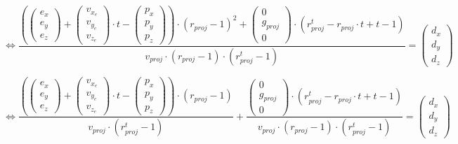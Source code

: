 \begin{equation*}
    \Leftrightarrow \frac{({\begin{pmatrix} e_x \\ e_y \\ e_z \end{pmatrix}} + {\begin{pmatrix} v_{x_e} \\ v_{y_e} \\ v_{z_e} \end{pmatrix}} \cdot t - {\begin{pmatrix} p_x \\ p_y \\ p_z \end{pmatrix}}) \cdot (r_{proj} - 1)^2 + {\begin{pmatrix} 0 \\ g_{proj} \\ 0 \end{pmatrix}} \cdot (r_{proj}^t - r_{proj} \cdot t + t - 1)}{v_{proj} \cdot (r_{proj} - 1) \cdot (r_{proj}^t - 1)} = {\begin{pmatrix} d_x \\ d_y \\ d_z \end{pmatrix}}
\end{equation*}

\begin{equation*}
    \Leftrightarrow
    \frac{({\begin{pmatrix} e_x \\ e_y \\ e_z \end{pmatrix}} 
        + {\begin{pmatrix} v_{x_e} \\ v_{y_e} \\ v_{z_e} \end{pmatrix}}
            \cdot t - {\begin{pmatrix} p_x \\ p_y \\ p_z \end{pmatrix}}) \cdot (r_{proj} - 1)}
        {v_{proj} \cdot (r_{proj}^t - 1)}
    + \frac{{\begin{pmatrix} 0 \\ g_{proj} \\ 0 \end{pmatrix}}
        \cdot (r_{proj}^t - r_{proj} \cdot t + t - 1)}
        {v_{proj} \cdot (r_{proj} - 1) \cdot (r_{proj}^t - 1)}
    =
    {\begin{pmatrix} d_x \\ d_y \\ d_z \end{pmatrix}}
\end{equation*}

